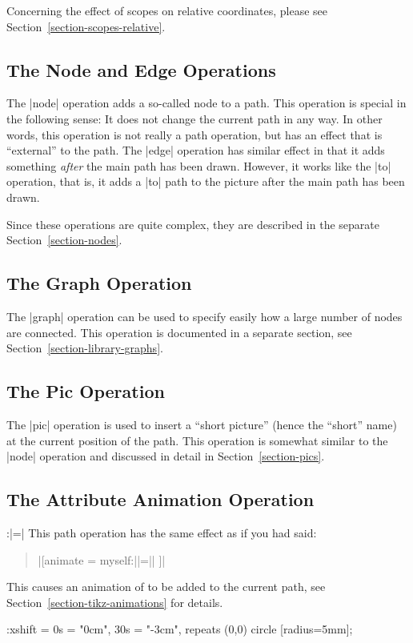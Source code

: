 Concerning the effect of scopes on relative coordinates, please see
Section~\ref{section-scopes-relative}.


\subsection{The Node and Edge Operations}

The |node| operation adds a so-called node to a path. This operation is special
in the following sense: It does not change the current path in any way. In
other words, this operation is not really a path operation, but has an effect
that is ``external'' to the path. The |edge| operation has similar effect in
that it adds something \emph{after} the main path has been drawn. However, it
works like the |to| operation, that is, it adds a |to| path to the picture
after the main path has been drawn.

Since these operations are quite complex, they are described in the separate
Section~\ref{section-nodes}.


\subsection{The Graph Operation}

The |graph| operation can be used to specify easily how a large number of nodes
are connected. This operation is documented in a separate section, see
Section~\ref{section-library-graphs}.


\subsection{The Pic Operation}

The |pic| operation is used to insert a ``short picture'' (hence the ``short''
name) at the current position of the path. This operation is somewhat similar
to the |node| operation and discussed in detail in Section~\ref{section-pics}.


\subsection{The Attribute Animation Operation}

\begin{pathoperation}{:}{|=|}
    This path operation has the same effect as if you had said:
    \begin{quote}
        |[animate = { myself:||=||} ]|
    \end{quote}
    This causes an animation of  to be added to the
    current path, see Section~\ref{section-tikz-animations} for details.
\begin{codeexample}[width=2cm,preamble={\usetikzlibrary{animations}}]
\tikz \draw :xshift = {0s = "0cm", 30s = "-3cm", repeats} (0,0) circle [radius=5mm];
\end{codeexample}
\end{pathoperation}


